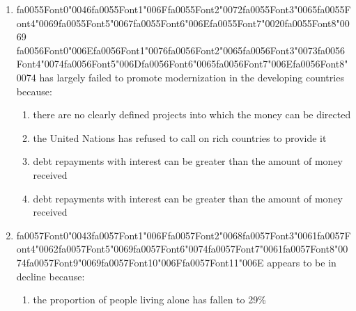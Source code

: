 \documentclass[12pt]{article}
\begin{document}
\begin{enumerate}[label=\arabic*.]
\begin{enumerate}[label=(\alph*)]
    \item impersonal rules
    \item extensive paperwork
    \item hierarchy of officials
    \item Salaries
\end{enumerate}
\item {\csname fa0055Font0\endcsname\char"0046}{\csname fa0055Font1\endcsname\char"006F}{\csname fa0055Font2\endcsname\char"0072}{\csname fa0055Font3\endcsname\char"0065}{\csname fa0055Font4\endcsname\char"0069}{\csname fa0055Font5\endcsname\char"0067}{\csname fa0055Font6\endcsname\char"006E}{\csname fa0055Font7\endcsname\char"0020}{\csname fa0055Font8\endcsname\char"0069} {\csname fa0056Font0\endcsname\char"006E}{\csname fa0056Font1\endcsname\char"0076}{\csname fa0056Font2\endcsname\char"0065}{\csname fa0056Font3\endcsname\char"0073}{\csname fa0056Font4\endcsname\char"0074}{\csname fa0056Font5\endcsname\char"006D}{\csname fa0056Font6\endcsname\char"0065}{\csname fa0056Font7\endcsname\char"006E}{\csname fa0056Font8\endcsname\char"0074} has largely failed to promote modernization in the developing countries because:
\begin{enumerate}[label=(\alph*)]
    \item there are no clearly defined projects into which the money can be directed
    \item the United Nations has refused to call on rich countries to provide it
    \item debt repayments with interest can be greater than the amount of money received
    \item debt repayments with interest can be greater than the amount of money received
\end{enumerate}
\item {\csname fa0057Font0\endcsname\char"0043}{\csname fa0057Font1\endcsname\char"006F}{\csname fa0057Font2\endcsname\char"0068}{\csname fa0057Font3\endcsname\char"0061}{\csname fa0057Font4\endcsname\char"0062}{\csname fa0057Font5\endcsname\char"0069}{\csname fa0057Font6\endcsname\char"0074}{\csname fa0057Font7\endcsname\char"0061}{\csname fa0057Font8\endcsname\char"0074}{\csname fa0057Font9\endcsname\char"0069}{\csname fa0057Font10\endcsname\char"006F}{\csname fa0057Font11\endcsname\char"006E} appears to be in decline because:
\begin{enumerate}[label=(\alph*)]
    \item the proportion of people living alone has fallen to 29\%

\end{enumerate}
\end{enumerate}
\end{document}
